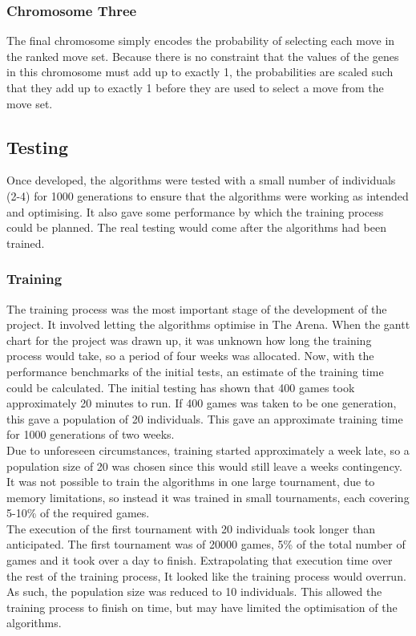 \subsubsection{Chromosome Three}
The final chromosome simply encodes the probability of selecting each move in the ranked move set. Because there is no constraint that the values of the genes in this chromosome must add up to exactly 1, the probabilities are scaled such that they add up to exactly 1 before they are used to select a move from the move set.

\subsection{Testing}
\label{sec:p2test}
Once developed, the algorithms were tested with a small number of individuals (2-4) for 1000 generations to ensure that the algorithms were working as intended and optimising. It also gave some performance by which the training process could be planned. The real testing would come after the algorithms had been trained.

\subsubsection{Training}
The training process was the most important stage of the development of the project. It involved letting the algorithms optimise in The Arena. When the gantt chart for the project was drawn up, it was unknown how long the training process would take, so a period of four weeks was allocated. Now, with the performance benchmarks of the initial tests, an estimate of the training time could be calculated. The initial testing has shown that 400 games took approximately 20 minutes to run. If 400 games was taken to be one generation, this gave a population of 20 individuals. This gave an approximate training time for 1000 generations of two weeks.
\\Due to unforeseen circumstances, training started approximately a week late, so a population size of 20 was chosen since this would still leave a weeks contingency. It was not possible to train the algorithms in one large tournament, due to memory limitations, so instead it was trained in small tournaments, each covering 5-10\% of the required games.
\\The execution of the first tournament with 20 individuals took longer than anticipated. The first tournament was of 20000 games, 5\% of the total number of games and it took over a day to finish. Extrapolating that execution time over the rest of the training process, It looked like the training process would overrun. As such, the population size was reduced to 10 individuals. This allowed the training process to finish on time, but may have limited the optimisation of the algorithms.

